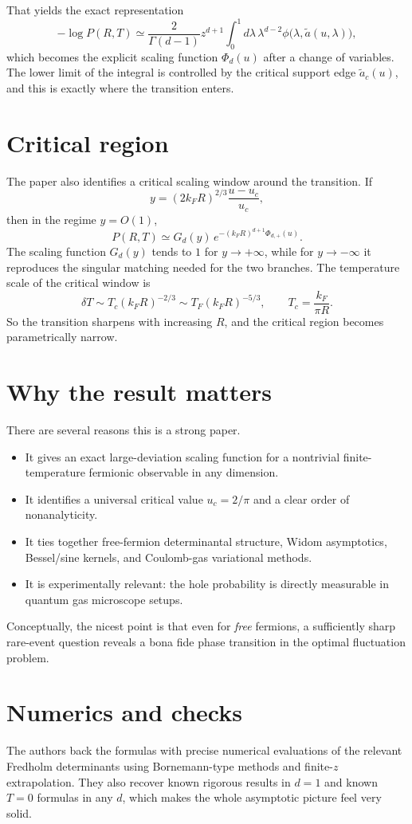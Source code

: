 \documentclass[11pt]{article}
\begin{document}
That yields the exact representation
\[
-\log P(R,T)\simeq \frac{2}{\Gamma(d-1)} z^{d+1}
\int_0^1 d\lambda\, \lambda^{d-2} \phi\big(\lambda,\tilde a(u,\lambda)\big),
\]
which becomes the explicit scaling function $\Phi_d(u)$ after a change of variables. The lower limit of the integral is controlled by the critical support edge $\tilde a_c(u)$, and this is exactly where the transition enters.

\section*{Critical region}
The paper also identifies a critical scaling window around the transition. If
\[
y=(2k_FR)^{2/3}\frac{u-u_c}{u_c},
\]
then in the regime $y=O(1)$,
\[
P(R,T)\simeq G_d(y)\, e^{-(k_FR)^{d+1}\Phi_{d,+}(u)}.
\]
The scaling function $G_d(y)$ tends to $1$ for $y\to+\infty$, while for $y\to-\infty$ it reproduces the singular matching needed for the two branches. The temperature scale of the critical window is
\[
\delta T \sim T_c (k_F R)^{-2/3}
\sim T_F (k_F R)^{-5/3},
\qquad T_c=\frac{k_F}{\pi R}.
\]
So the transition sharpens with increasing $R$, and the critical region becomes parametrically narrow.

\section*{Why the result matters}
There are several reasons this is a strong paper.

\begin{itemize}[leftmargin=1.5em]
\item It gives an exact large-deviation scaling function for a nontrivial finite-temperature fermionic observable in any dimension.
\item It identifies a universal critical value $u_c=2/\pi$ and a clear order of nonanalyticity.
\item It ties together free-fermion determinantal structure, Widom asymptotics, Bessel/sine kernels, and Coulomb-gas variational methods.
\item It is experimentally relevant: the hole probability is directly measurable in quantum gas microscope setups.
\end{itemize}

Conceptually, the nicest point is that even for \emph{free} fermions, a sufficiently sharp rare-event question reveals a bona fide phase transition in the optimal fluctuation problem.

\section*{Numerics and checks}
The authors back the formulas with precise numerical evaluations of the relevant Fredholm determinants using Bornemann-type methods and finite-$z$ extrapolation. They also recover known rigorous results in $d=1$ and known $T=0$ formulas in any $d$, which makes the whole asymptotic picture feel very solid.
\end{document}
